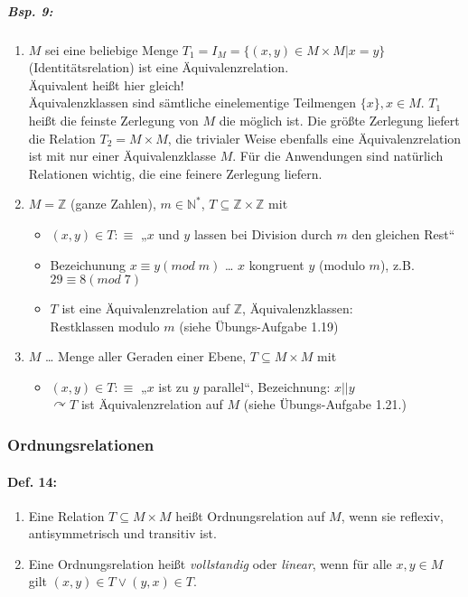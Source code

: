 \subparagraph{Bsp. 9:}
\begin{enumerate}[label=\alph*)]
\item $M$ sei eine beliebige Menge $T_1=I_M=\{ (x,y) \in M\times M | x=y\}$ (Identitätsrelation) ist eine Äquivalenzrelation.\\
Äquivalent heißt hier gleich! \\
Äquivalenzklassen sind sämtliche einelementige Teilmengen $\{x\}, x\in M$. $T_1$ heißt die feinste Zerlegung von $M$ die möglich ist. Die größte Zerlegung liefert die Relation $T_2=M\times M$, die trivialer Weise ebenfalls eine Äquivalenzrelation ist mit nur einer Äquivalenzklasse $M$. Für die Anwendungen sind natürlich Relationen wichtig, die eine feinere Zerlegung liefern.
\item $M = \mathbb{Z}$ (ganze Zahlen), $m\in \mathbb{N}^*$, $T\subseteq \mathbb{Z}\times \mathbb{Z}$ mit
\begin{itemize}
\item $(x,y) \in T : \equiv$ „$x$ und $y$ lassen bei Division durch $m$ den gleichen Rest“
\item Bezeichunung $x \equiv y (mod\; m)$ … $x$ kongruent $y$ (modulo $m$), z.B. $29 \equiv 8 (mod\; 7)$
\item $T$ ist eine Äquivalenzrelation auf $\mathbb{Z}$, Äquivalenzklassen:\\
Restklassen modulo $m$ (siehe Übungs-Aufgabe 1.19)
\end{itemize}
\item $M$ … Menge aller Geraden einer Ebene, $T\subseteq M \times M$ mit
\begin{itemize}
\item $(x,y) \in T :\equiv$ „$x$ ist zu $y$ parallel“, Bezeichnung: $x||y$\\
$\curvearrowright T$ ist Äquivalenzrelation auf $M$ (siehe Übungs-Aufgabe 1.21.)
\end{itemize}
\end{enumerate}

\subsubsection{Ordnungsrelationen} \label{subsec:Ordnungsrelationen}
\paragraph{Def. 14:}
\begin{enumerate}[label=\alph*)]
\item Eine Relation $T\subseteq M\times M$ heißt Ordnungsrelation auf $M$, wenn sie reflexiv, antisymmetrisch und transitiv ist.
\item Eine Ordnungsrelation heißt \emph{vollstandig} oder \emph{linear}, wenn für alle $x,y \in M$ gilt $(x,y)\in T \vee (y,x) \in T$.
\end{enumerate}


